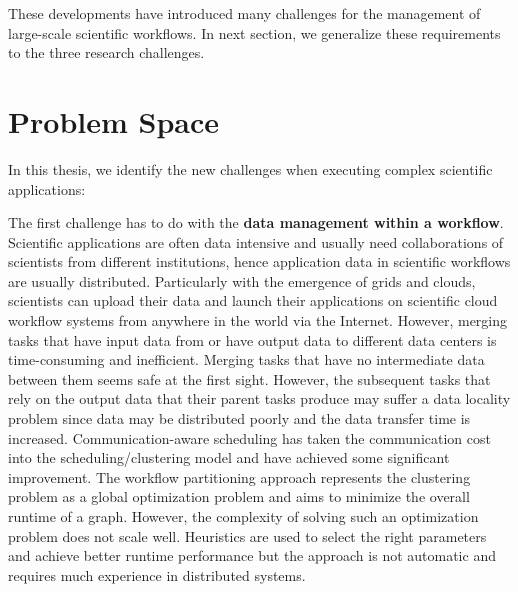 These developments have introduced many challenges for the management of large-scale scientific workflows. In next section, we generalize these requirements to the three research challenges. 

\section{Problem Space}

In this thesis, we identify the new challenges when executing complex scientific applications:

The first challenge has to do with the \textbf{data management within a workflow}. Scientific applications are often data intensive and usually need collaborations of scientists from different institutions, hence application data in scientific workflows are usually distributed. Particularly with the emergence of grids and clouds, scientists can upload their data and launch their applications on scientific cloud workflow systems from anywhere in the world via the Internet. However, merging tasks that have input data from or have output data to different data centers is time-consuming and inefficient. Merging tasks that have no intermediate data between them seems safe at the first sight. However, the subsequent tasks that rely on the output data that their parent tasks produce may suffer a data locality problem since data may be distributed poorly and the data transfer time is increased. Communication-aware scheduling \cite{Sonmez2006, Jones2004} has taken the communication cost into the scheduling/clustering model and have achieved some significant improvement. The workflow partitioning approach \cite{Hedayat2009, Yuan2010, Wieczorek2005,Rubing2005} represents the clustering problem as a global optimization problem and aims to minimize the overall runtime of a graph. However, the complexity of solving such an optimization problem does not scale well. Heuristics \cite{Maheshwari2012, Callaghan2010} are used to select the right parameters and achieve better runtime performance but the approach is not automatic and requires much experience in distributed systems. 


